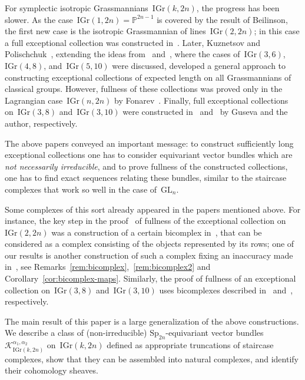 \documentclass[a4paper]{article}
\newcommand{\Sp}{\mathrm{Sp}}
\newcommand{\IGr}{\mathrm{IGr}}
\newcommand{\GL}{\mathrm{GL}}
\newcommand{\cK}{\mathcal{K}}
\theoremstyle{remark}
\theoremstyle{definition}
\begin{document}
For symplectic isotropic Grassmannians~\(\IGr(k,2n)\), the progress has been slower.
As the case~\(\IGr(1, 2n) = \mathbb{P}^{2n - 1}\) is covered by the result of Beilinson, 
the first new case is the isotropic Grassmannian of lines~\(\IGr(2, 2n)\);
in this case a full exceptional collection was constructed in~\cite{lines}. 
Later, Kuznetsov and Polischchuk~\cite{KuzPol}, extending the ideas from~\cite{LG3} and~\cite{LG45}, 
where the cases of~\(\IGr(3,6)\), \(\IGr(4, 8)\), and~\(\IGr(5, 10)\) were discussed,
developed a general approach to constructing exceptional collections of expected length on all Grassmannians of classical groups. 
However, fullness of these collections was proved only in the Lagrangian case~\(\IGr(n,2n)\) by Fonarev~\cite{F19}. 
Finally, full exceptional collections on~\(\IGr(3,8)\) and~\(\IGr(3,10)\) 
were constructed in~\cite{38} and~\cite{N20} by Guseva and the author, respectively.

The above papers conveyed an important message:
to construct sufficiently long exceptional collections 
one has to consider equivariant vector bundles which are \emph{not necessarily irreducible},
and to prove fullness of the constructed collections,
one has to find exact sequences relating these bundles, 
similar to the staircase complexes that work so well in the case of~\(\GL_n\).

Some complexes of this sort already appeared in the papers mentioned above.
For instance, the key step in the proof~\cite{lines} of fullness of the exceptional collection on~\(\IGr(2,2n)\) 
was a construction of a certain bicomplex in~\cite[Proposition~5.3]{lines},
that can be considered as a complex consisting of the objects represented by its rows;
one of our results is another construction of such a complex 
fixing an inaccuracy made in~\cite{lines}, see Remarks~\ref{rem:bicomplex},~\ref{rem:bicomplex2} and Corollary~\ref{cor:bicomplex-maps}.
Similarly, the proof of fullness of an exceptional collection on~\(\IGr(3,8)\) and~\(\IGr(3,10)\)
uses bicomplexes described in~\cite[Section~5.2]{38} and~\cite[Section~3.2]{N20}, respectively.

The main result of this paper is a large generalization of the above constructions.
We describe a class of (non-irreducible) \(\Sp_{2n}\)-equivariant vector bundles~\(\cK_{\IGr(k,2n)}^{\alpha_1,\alpha_2}\) on~\(\IGr(k,2n)\)
defined as appropriate truncations of staircase complexes, 
show that they can be assembled into natural complexes,
and identify their cohomology sheaves.
\end{document}
